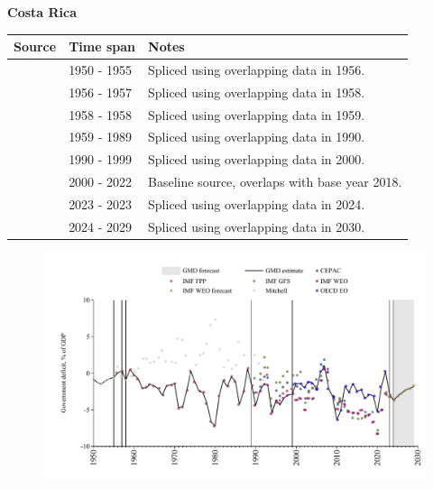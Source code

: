 \documentclass[12pt,a4paper,landscape]{article}
\begin{document}
\begin{adjustbox}{max totalsize={\paperwidth}{\paperheight},center}
\begin{minipage}[t][\textheight][t]{\textwidth}
\vspace*{0.5cm}
{}
\begin{center}
{\Large\bfseries Costa Rica}
\end{center}
\vspace{0.5cm}
\begin{table}[H]
\centering
\small
\begin{tabular}{|l|l|l|}
\hline
\textbf{Source} & \textbf{Time span} & \textbf{Notes} \\
\hline
\rowcolor{white}\cite{Mitchell}& 1950 - 1955 &Spliced using overlapping data in 1956.\\
\rowcolor{lightgray}\cite{IMF_FPP}& 1956 - 1957 &Spliced using overlapping data in 1958.\\
\rowcolor{white}\cite{Mitchell}& 1958 - 1958 &Spliced using overlapping data in 1959.\\
\rowcolor{lightgray}\cite{IMF_FPP}& 1959 - 1989 &Spliced using overlapping data in 1990.\\
\rowcolor{white}\cite{IMF_WEO}& 1990 - 1999 &Spliced using overlapping data in 2000.\\
\rowcolor{lightgray}\cite{OECD_EO}& 2000 - 2022 &Baseline source, overlaps with base year 2018.\\
\rowcolor{white}\cite{IMF_GFS}& 2023 - 2023 &Spliced using overlapping data in 2024.\\
\rowcolor{lightgray}\cite{IMF_WEO_forecast}& 2024 - 2029 &Spliced using overlapping data in 2030.\\
\hline
\end{tabular}
\end{table}
\begin{figure}[H]
\centering
\includegraphics[width=\textwidth,height=0.6\textheight,keepaspectratio]{graphs/CRI_govdef_GDP.pdf}
\end{figure}
\end{minipage}
\end{adjustbox}
\end{document}
